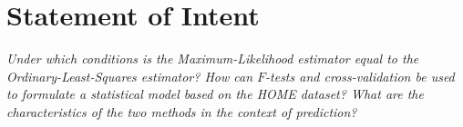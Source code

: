 \section{Statement of Intent}\label{sec:statement_of_intent}
\textit{Under which conditions is the Maximum-Likelihood estimator equal to the Ordinary-Least-Squares estimator?
How can $F$-tests and cross-validation be used to formulate a statistical model based on the HOME dataset?
What are the characteristics of the two methods in the context of prediction?}

